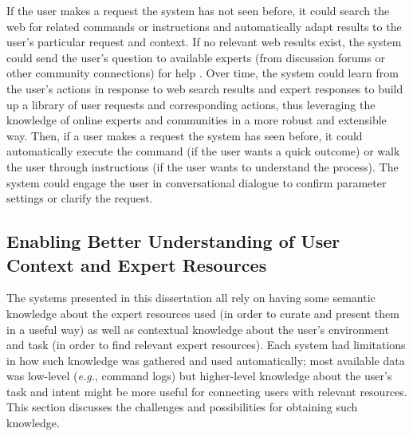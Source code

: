 If the user makes a request the system has not seen before, it could search the web for related commands or instructions and automatically adapt results to the user's particular request and context. If no relevant web results exist, the system could send the user's question to available experts (from discussion forums or other community connections) for help \cite{Ackerman1990, Chen2017, Kim2012}. Over time, the system could learn from the user's actions in response to web search results and expert responses to build up a library of user requests and corresponding actions, thus leveraging the knowledge of online experts and communities in a more robust and extensible way. Then, if a user makes a request the system has seen before, it could automatically execute the command (if the user wants a quick outcome) or walk the user through instructions (if the user wants to understand the process). The system could engage the user in conversational dialogue to confirm parameter settings or clarify the request. 

\subsection{Enabling Better Understanding of User Context and Expert Resources}
The systems presented in this dissertation all rely on having some semantic knowledge about the expert resources used (in order to curate and present them in a useful way) as well as contextual knowledge about the user's environment and task (in order to find relevant expert resources). Each system had limitations in how such knowledge was gathered and used automatically; most available data was low-level (\textit{e.g.}, command logs) but higher-level knowledge about the user's task and intent might be more useful for connecting users with relevant resources. This section discusses the challenges and possibilities for obtaining such knowledge.


